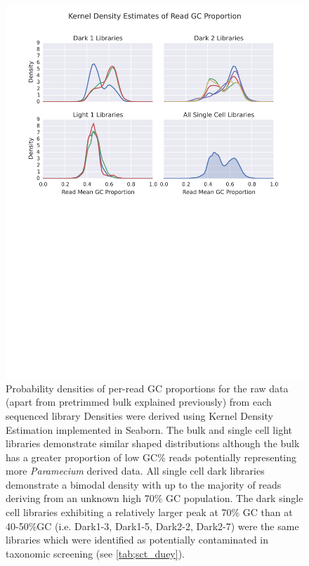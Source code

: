 \begin{figure}[h]
    \includegraphics[width=\textwidth]{lib_gc_prop.svg}
    \caption{Probability densities of per-read GC proportions for the raw data (apart from pretrimmed bulk explained previously)
        from each sequenced library 
        Densities were derived using Kernel Density Estimation implemented in Seaborn. 
        The bulk and single cell light libraries demonstrate similar shaped distributions
        although the bulk has a greater proportion of low GC\% reads potentially representing
        more \textit{Paramecium} derived data. All single cell dark libraries 
        demonstrate a bimodal density with up to the majority of reads deriving 
        from an unknown high 70\% GC population. The dark single cell libraries
        exhibiting a relatively larger peak at 70\% GC than at 40-50\%GC (i.e.
        Dark1-3, Dark1-5, Dark2-2, Dark2-7) were
        the same libraries which were identified as potentially contaminated
        in taxonomic screening (see \ref{tab;sct_duey}).
    }
    \label{fig;gc_prop_raw}
\end{figure}


